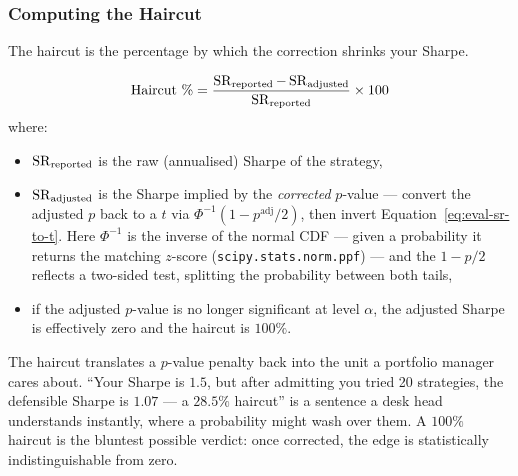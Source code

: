 \subsubsection{Computing the Haircut}

The haircut is the percentage by which the correction shrinks your Sharpe.

\begin{equation}
\label{eq:eval-haircut-pct}
\text{Haircut \%} = \frac{\operatorname{SR}_{\text{reported}} - \operatorname{SR}_{\text{adjusted}}}{\operatorname{SR}_{\text{reported}}} \times 100
\end{equation}
where:
\begin{itemize}[nosep]
  \item $\operatorname{SR}_{\text{reported}}$ is the raw (annualised) Sharpe of the strategy,
  \item $\operatorname{SR}_{\text{adjusted}}$ is the Sharpe implied by the \emph{corrected} $p$-value --- convert the adjusted $p$ back to a $t$ via $\Phi^{-1}(1 - p^{\text{adj}}/2)$, then invert Equation~\eqref{eq:eval-sr-to-t}. Here $\Phi^{-1}$ is the inverse of the normal CDF --- given a probability it returns the matching $z$-score (\texttt{scipy.stats.norm.ppf}) --- and the $1 - p/2$ reflects a two-sided test, splitting the probability between both tails,
  \item if the adjusted $p$-value is no longer significant at level $\alpha$, the adjusted Sharpe is effectively zero and the haircut is $100\%$.
\end{itemize}

\begin{intuition}
The haircut translates a $p$-value penalty back into the unit a portfolio manager cares about.
``Your Sharpe is $1.5$, but after admitting you tried 20 strategies, the defensible Sharpe is $1.07$ --- a $28.5\%$ haircut'' is a sentence a desk head understands instantly, where a probability might wash over them.
A $100\%$ haircut is the bluntest possible verdict: once corrected, the edge is statistically indistinguishable from zero.
\end{intuition}

